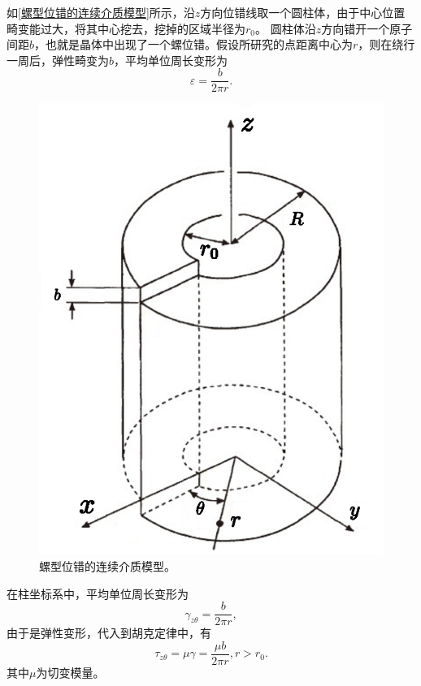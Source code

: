             如\autoref{螺型位错的连续介质模型}所示，沿$z$方向位错线取一个圆柱体，由于中心位置畸变能过大，将其中心挖去，挖掉的区域半径为$r_0$。
            圆柱体沿$z$方向错开一个原子间距$b$，也就是晶体中出现了一个螺位错。假设所研究的点距离中心为$r$，则在绕行一周后，弹性畸变为$b$，平均单位周长变形为
            \begin{equation}
                \varepsilon=\frac{b}{2\pi r}.
            \end{equation}

            \begin{figure}[ht]
                \centering
                \includegraphics[scale=0.5]{fig/螺型位错的连续介质模型.eps}
                \caption{螺型位错的连续介质模型。}
                \label{螺型位错的连续介质模型}
            \end{figure}

            在柱坐标系中，平均单位周长变形为
            \begin{equation}
                \gamma_{z\theta}=\frac{b}{2\pi r},
            \end{equation}
            由于是弹性变形，代入到胡克定律中，有
            \begin{equation}
                \tau_{z\theta}=\mu\gamma=\frac{\mu b}{2\pi r}, r>r_0.
            \end{equation}
            其中$\mu$为切变模量。


